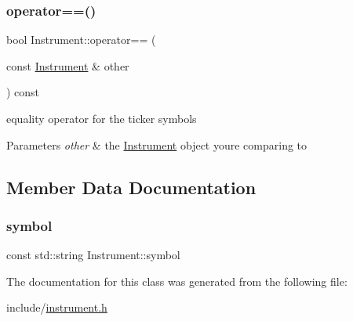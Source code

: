 \subsubsection{\texorpdfstring{operator==()}{operator==()}}
{\footnotesize\ttfamily bool Instrument\+::operator== (\begin{DoxyParamCaption}\item[{const \hyperlink{classInstrument}{Instrument} \&}]{other }\end{DoxyParamCaption}) const}



equality operator for the ticker symbols 


\begin{DoxyParams}{Parameters}
{\em other} & the \hyperlink{classInstrument}{Instrument} object you\textquotesingle{}re comparing to \\
\hline
\end{DoxyParams}


\subsection{Member Data Documentation}
\mbox{\label{classInstrument_a4c469c7cf9512a7b23eb1c26d94a0861}} 
\subsubsection{\texorpdfstring{symbol}{symbol}}
{\footnotesize\ttfamily const std\+::string Instrument\+::symbol}



The documentation for this class was generated from the following file\+:\begin{DoxyCompactItemize}
\item 
include/\hyperlink{instrument_8h}{instrument.\+h}\end{DoxyCompactItemize}
